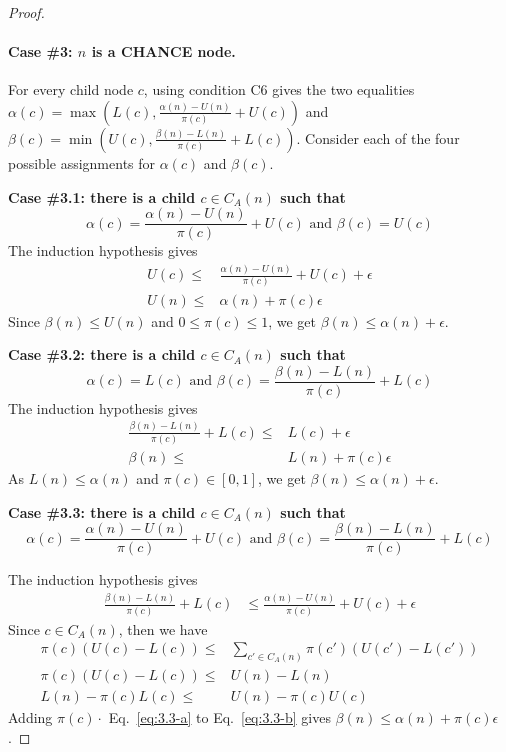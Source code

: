 \documentclass[letterpaper]{article} %
\newcommand{\pess}{\mathit{L}}
\newcommand{\opti}{\mathit{U}}
\begin{document}
\begin{proof}
\paragraph{Case \#3: $n$ is a CHANCE node.} 
For every child node $c$, using condition C6 gives the two equalities 
$\alpha(c)=\max(\pess(c), \frac{\alpha(n)-\opti(n)}{\pi(c)}+\opti(c))$
and $\beta(c)=\min(\opti(c), \frac{\beta(n)-\pess(n)}{\pi(c)}+\pess(c))$.
Consider each of the four possible assignments for $\alpha(c)$ and $\beta(c)$. 


\noindent \textbf{Case \#3.1: there is a child $c\in C_A(n)$ such that 
\[\alpha(c)=\frac{\alpha(n)-\opti(n)}{\pi(c)}+\opti(c) 
\text{ and } \beta(c)=\opti(c)\]}
\noindent The induction hypothesis gives
\begin{align}
\opti(c) \leq & \frac{\alpha(n)-\opti(n)}{\pi(c)}+\opti(c)+\epsilon \\
\opti(n) \leq & \alpha(n) + \pi(c)\epsilon
\end{align}
Since $\beta(n)\!\leq\!\!\opti(n)$ and $0\!\leq\!\pi(c)\!\leq\!1$, we get $\beta(n)\!\leq\!\alpha(n) + \epsilon$.

\textbf{Case \#3.2: there is a child $c\in C_A(n)$ such that
\[ \alpha(c)=\pess(c) \text{ and } \beta(c)=\frac{\beta(n)-\pess(n)}{\pi(c)}+\pess(c) \]}
\noindent The induction hypothesis gives
\begin{align}
\frac{\beta(n)-\pess(n)}{\pi(c)}+\pess(c) \leq & \pess(c)+\epsilon \\
\beta(n) \leq & \pess(n) + \pi(c) \epsilon
\end{align}
As $\pess(n) \leq \alpha(n)$ and $\pi(c)$$\in$$[0,1]$, we get $\beta(n) \leq \alpha(n) + \epsilon$.


\textbf{Case \#3.3: there is a child $c\in C_A(n)$ such that 
\[\alpha(c)=\frac{\alpha(n)-\opti(n)}{\pi(c)}+\opti(c) \text{ and } \beta(c)=\frac{\beta(n)-\pess(n)}{\pi(c)}+\pess(c)\]}
 
\noindent The induction hypothesis gives
\begin{align}
\frac{\beta(n)-\pess(n)}{\pi(c)}+\pess(c) &\leq \frac{\alpha(n)-\opti(n)}{\pi(c)}+\opti(c) + \epsilon\label{eq:3.3-a}
\end{align}
Since $c\in C_A(n)$, then we have
\begin{align}
\pi(c)(\opti(c)-\pess(c)) \leq & \!\!\sum_{c'\in C_A(n)\!\!\!\!\!\!\!\!\!} \!\pi(c')(\opti(c')-\pess(c'))\\
\pi(c)(\opti(c)-\pess(c)) \leq & \opti(n)-\pess(n)\\
\pess(n) - \pi(c)\pess(c) \leq & \opti(n)-\pi(c)\opti(c) \label{eq:3.3-b}
\end{align}
Adding $\pi(c) \cdot$ Eq.~\eqref{eq:3.3-a} to Eq.~\eqref{eq:3.3-b} gives $\beta(n) \leq \alpha(n)+\pi(c)\epsilon$.


\end{proof}
\end{document}
